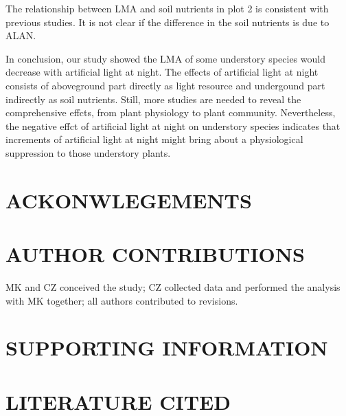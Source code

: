 \documentclass[
]{article}
\begin{document}
The relationship between LMA and soil nutrients in plot 2 is consistent
with previous studies. It is not clear if the difference in the soil
nutrients is due to ALAN.

In conclusion, our study showed the LMA of some understory species would
decrease with artificial light at night. The effects of artificial light
at night consists of aboveground part directly as light resource and
undergound part indirectly as soil nutrients. Still, more studies are
needed to reveal the comprehensive effcts, from plant physiology to
plant community. Nevertheless, the negative effct of artificial light at
night on understory species indicates that increments of artificial
light at night might bring about a physiological suppression to those
understory plants.

\hypertarget{ackonwlegements}{%
\section{ACKONWLEGEMENTS}\label{ackonwlegements}}

\hypertarget{author-contributions}{%
\section{AUTHOR CONTRIBUTIONS}\label{author-contributions}}

MK and CZ conceived the study; CZ collected data and performed the
analysis with MK together; all authors contributed to revisions.

\hypertarget{supporting-information}{%
\section{SUPPORTING INFORMATION}\label{supporting-information}}

\hypertarget{literature-cited}{%
\section{LITERATURE CITED}\label{literature-cited}}
\end{document}
